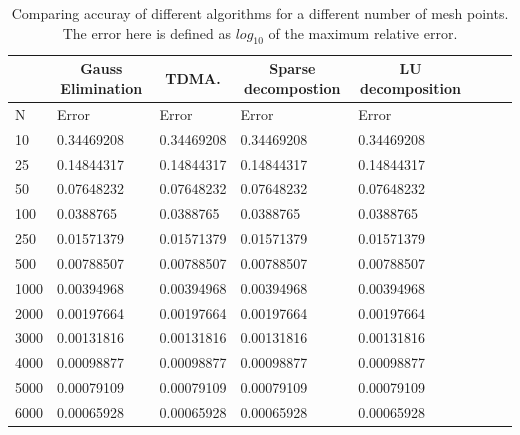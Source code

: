 \documentclass[11pt,a4paper,english,draft]{article}
\numberwithin{equation}{section}
\begin{document}
\begin{table}[ht!]
\centering
\caption{Comparing accuray of different algorithms for a different number
of mesh points. The error here is defined as $log_{10}$ of the maximum 
relative error. }
\vspace{3mm}
\begin{tabular}{|l|l|l|l|l|l|l|l|}
\hline
\multicolumn{1}{|c|}{ } & \multicolumn{1}{|c|}{Gauss Elimination} & \multicolumn{1}{|c|}{TDMA.} & \multicolumn{1}{|c|}{Sparse decompostion} & \multicolumn{1}{|c|}{LU decomposition}  \\
\hline
N & Error & Error & Error & Error  \\
\hline
10 & 0.34469208 &  0.34469208 &  0.34469208 &  0.34469208\\
25 & 0.14844317 &  0.14844317 &  0.14844317 &  0.14844317\\
50 & 0.07648232 &  0.07648232 &  0.07648232 &  0.07648232\\
100 & 0.0388765  &  0.0388765  &  0.0388765  &  0.0388765 \\
250 & 0.01571379 &  0.01571379 &  0.01571379 &  0.01571379\\
500 & 0.00788507 &  0.00788507 &  0.00788507 &  0.00788507\\
1000 & 0.00394968 &  0.00394968 &  0.00394968 &  0.00394968\\
2000 & 0.00197664 &  0.00197664 &  0.00197664 &  0.00197664\\
3000 & 0.00131816 &  0.00131816 &  0.00131816 &  0.00131816\\
4000 & 0.00098877 &  0.00098877 &  0.00098877 &  0.00098877\\
5000 & 0.00079109 &  0.00079109 &  0.00079109 &  0.00079109\\
6000 & 0.00065928 &  0.00065928 &  0.00065928 &  0.00065928\\
\hline
\end{tabular}
\label{tab:err}
\end{table}
\end{document}
